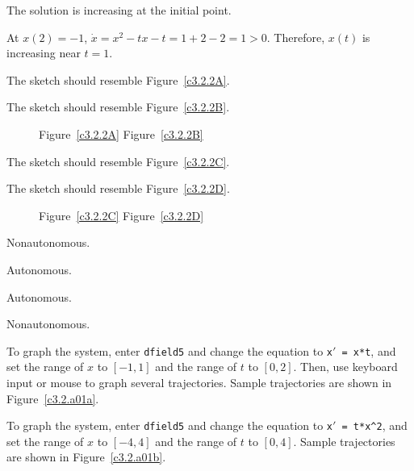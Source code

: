   \ans The solution is increasing at the initial point.

\soln At $x(2)=-1$, $\dot{x}=x^2-tx-t=1+2-2=1>0$.  Therefore, $x(t)$ is
increasing near $t=1$.

 The sketch should resemble Figure~\ref{c3.2.2A}.

 The sketch should resemble Figure~\ref{c3.2.2B}.
\begin{figure}[th]
     \centerline{%
     }
	\centerline{Figure~\ref{c3.2.2A}\hspace{2.1in} Figure~\ref{c3.2.2B}}
\end{figure} 

 The sketch should resemble Figure~\ref{c3.2.2C}.

 The sketch should resemble Figure~\ref{c3.2.2D}.
\begin{figure}[th]
     \centerline{%
     }
	\centerline{Figure~\ref{c3.2.2C}\hspace{2.1in} Figure~\ref{c3.2.2D}}
\end{figure} 

 Nonautonomous.

 Autonomous.

 Autonomous.

 Nonautonomous.


\newpage
{}
To graph the system, enter {\tt dfield5} and change the equation to
{\tt x$'$ = x*t}, and set the range of $x$ to $[-1,1]$ and the range
of $t$ to $[0,2]$.  Then, use keyboard input or mouse to graph
several trajectories.  Sample trajectories are shown in
Figure~\ref{c3.2.a01a}.

\begin{figure}[htb]
                       \centerline{%
                       }
\end{figure}

To graph the system, enter {\tt dfield5} and change the equation to
{\tt x$'$ = t*x\^{}2}, and set the range of $x$ to $[-4,4]$ and the range
of $t$ to $[0,4]$.  Sample trajectories are shown in
Figure~\ref{c3.2.a01b}.

\begin{figure}[htb]
                       \centerline{%
                       }
\end{figure}

